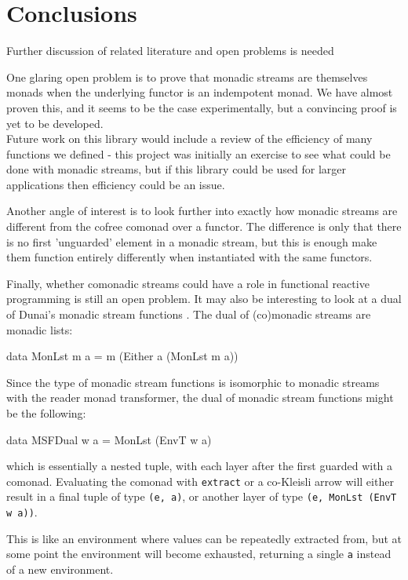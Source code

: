 \section{Conclusions}

\begin{ccomment} 
	Further discussion of related literature and open problems is needed
\end{ccomment}

One glaring open problem is to prove that monadic streams are themselves monads when the underlying functor is an indempotent monad. We have almost proven this, and it seems to be the case experimentally, but a convincing proof is yet to be developed.\\

Future work on this library would include a review of the efficiency of many functions we defined - this project was initially an exercise to see what could be done with monadic streams, but if this library could be used for larger applications then efficiency could be an issue. 

Another angle of interest is to look further into exactly how monadic streams are different from the cofree comonad over a functor. The difference is only that there is no first 'unguarded' element in a monadic stream, but this is enough make them function entirely differently when instantiated with the same functors.

Finally, whether comonadic streams could have a role in functional reactive programming is still an open problem. It may also be interesting to look at a dual of Dunai's monadic stream functions \cite{dunai}. The dual of (co)monadic streams are monadic lists:
\begin{haskell}
data MonLst m a = m (Either a (MonLst m a)) 
\end{haskell}
Since the type of monadic stream functions is isomorphic to monadic streams with the reader monad transformer, the dual of monadic stream functions might be the following:
\begin{haskell}
data MSFDual w a = MonLst (EnvT w a)
\end{haskell}
which is essentially a nested tuple, with each layer after the first guarded with a comonad. Evaluating the comonad with \verb+extract+ or a co-Kleisli arrow will either result in a final tuple of type \verb+(e, a)+, or another layer of type \verb+(e, MonLst (EnvT w a))+. 

This is like an environment where values can be repeatedly extracted from, but at some point the environment will become exhausted, returning a single \verb+a+ instead of a new environment.
